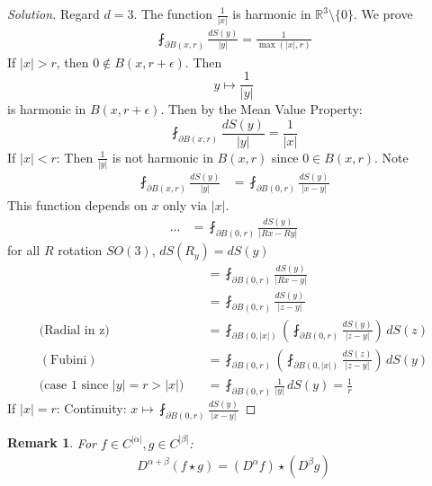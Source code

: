 \documentclass{report}
\theoremstyle{tommy}
\newtheorem{rem}[defn]{Remark}
\begin{document}
  \begin{proof}[Solution]
    Regard \(d = 3\). The function \(\frac{1}{|x|}\) is harmonic in \(\mathbb{R}^3 \setminus \{0\}\). We prove 
    \begin{align*}
      \fint_{\partial B(x, r)} \frac{dS(y)}{|y|} = \frac{1}{\max(|x|, r)}
    \end{align*}
    If \(|x| > r\), then \(0 \notin B(x,r + \epsilon)\). Then
    \[y \mapsto \frac{1}{|y|}\] is harmonic in \(B(x, r  + \epsilon)\). Then by the Mean Value Property:
    \[\fint_{\partial B(x,r)} \frac{dS(y)}{|y|} = \frac{1}{|x|}\]
    If \(|x| < r\): Then \(\frac{1}{|y|}\) is not harmonic in \(B(x,r)\) since \(0 \in B(x,r)\). Note
    \begin{align*}
      \fint_{\partial B(x,r)} \frac{d S(y)}{|y|} 
      &= \fint_{\partial B(0, r)} \frac{dS(y)}{|x-y|}
    \end{align*}
    This function depends on \(x\) only via \(|x|\). 
    \begin{align*}
      ... &= \fint_{\partial B(0,r)} \frac{dS(y)}{|Rx-Ry|}
    \end{align*}
    for all \(R\) rotation \(SO(3)\), \(dS(R_y) = dS(y)\)
    \begin{align*}
      &= \fint_{\partial B(0, r)} \frac{dS(y)}{|Rx - y|} \\
      &= \fint_{\partial B(0, r)} \frac{dS(y)}{|z - y|} \\
      \text{(Radial in z)} \quad &= \fint_{\partial B(0, |x|)} \left(\fint_{\partial B(0, r)} \frac{dS(y)}{|z-y|}\right) \, dS(z) \\
      (\text{Fubini}) \quad &= \fint_{\partial B(0,r)} \left(\fint_{\partial B(0, |x|)} \frac{dS(z)}{|z-y|}\right) \, dS(y) \\
      (\text{case 1 since \(|y| = r > |x|\))} \quad &= \fint_{\partial B(0,r)} \frac{1}{|y|} \, dS(y)
      = \frac{1}{r}
    \end{align*}
    If \(|x| = r\): Continuity: \(x \mapsto \fint_{\partial B(0, r)} \frac{dS(y)}{|x-y|}\)
  \end{proof}

  \begin{rem}
    For \(f \in C^{|\alpha|}, g \in C^{|\beta|}\):
    \begin{align*}
      D^{\alpha + \beta}(f \star g) = (D^\alpha f)\star(D^\beta g)
    \end{align*}
  \end{rem}
\end{document}
